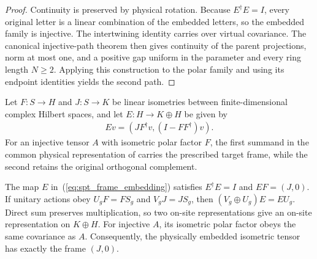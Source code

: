 \begin{proof}\leanok
    Continuity is preserved by physical rotation. Because $E^\dagger E=I$,
    every original letter is a linear combination of the embedded letters,
    so the embedded family is injective. The intertwining identity
    carries over virtual covariance. The canonical injective-path theorem
    then gives continuity of the parent projections, norm at most one,
    and a positive gap uniform in the parameter and every ring length
    $N\ge2$. Applying this construction to the polar family and using its
    endpoint identities yields the second path.
\end{proof}

\begin{definition}
    \label{def:spt_frame_embedding}
    \leanok
    Let $F:S\to H$ and $J:S\to K$ be linear isometries between finite-dimensional
    complex Hilbert spaces, and let $E:H\to K\oplus H$ be given by
    \begin{align}
        \label{eq:spt_frame_embedding}
        Ev=(JF^\dagger v,(I-FF^\dagger)v).
    \end{align}
    For an injective tensor $A$ with isometric polar factor $F$, the first
    summand in the common physical representation of
    \cite[Section~II.F.2]{Schuch2011Phases} carries the prescribed target
    frame, while the second retains the original orthogonal complement.
\end{definition}

\begin{lemma}
    \label{thm:spt_frame_embedding}
    \leanok
    The map $E$ in~(\ref{eq:spt_frame_embedding}) satisfies $E^\dagger E=I$
    and $EF=(J,0)$. If unitary actions obey $U_gF=FS_g$ and $V_gJ=JS_g$,
    then $(V_g\oplus U_g)E=EU_g$. Direct sum preserves multiplication,
    so two on-site representations give an on-site representation on $K\oplus H$.
    For injective $A$, its isometric polar factor obeys the same covariance
    as $A$. Consequently, the physically embedded isometric tensor has
    exactly the frame $(J,0)$.
\end{lemma}

